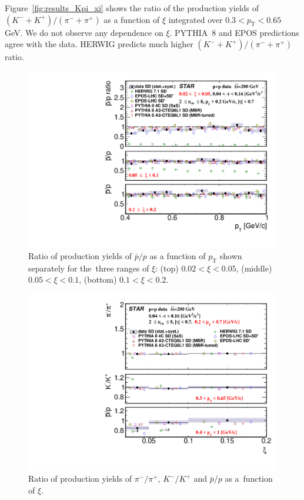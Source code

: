 Figure~\ref{fig:results_Kpi_xi} shows the ratio of the production yields of $\left(K^-+K^+\right)/\left(\pi^-+\pi^+\right)$ as a function of $\xi$ integrated over $0.3<p_\textrm{T}<0.65$ GeV. We do not observe any dependence on $\xi$. PYTHIA~8 and EPOS predictions agree with the data. HERWIG predicts much higher $\left(K^-+K^+\right)/\left(\pi^-+\pi^+\right)$ ratio. 

\begin{figure}[b!]
	\centering
	\includegraphics[width=.99\textwidth,page=1]{chapters/chrgSTAR/img/results/particleRatio_prt_2.pdf}
	\caption{Ratio of production yields of $\bar{p}/p$ as a function of $p_\textrm{T}$ shown separately for the~three ranges of $\xi$: (top) $0.02<\xi<0.05$, (middle) $0.05<\xi<0.1$, (bottom) $0.1<\xi<0.2$.}
	\label{fig:results_star_proton}
	
\end{figure}

\begin{figure}[b!]
	\centering
	\includegraphics[width=.99\textwidth,page=1]{chapters/chrgSTAR/img/results/ratio_xi.pdf}
	\caption{Ratio of production yields of $\pi^-/\pi^+$, $K^-/K^+$ and $\bar{p}/p$ as a~function of $\xi$. }
	\label{fig:results_mean_ratio_star}
	
\end{figure}

